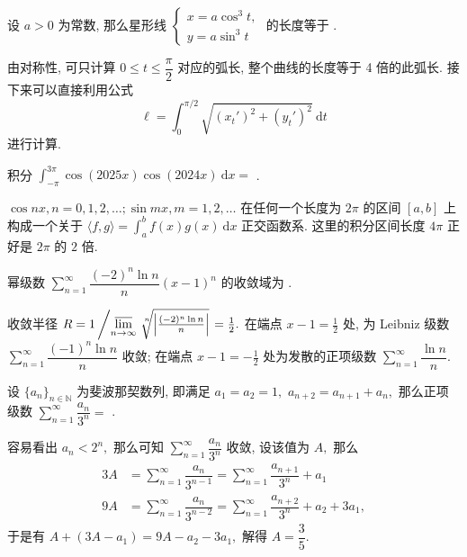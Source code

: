 \begin{question}
设 $a > 0$ 为常数, 那么星形线 $\begin{cases}
x = a \cos^3 t, \\ y = a \sin^3 t
\end{cases}$ 的长度等于 \fillin[$6a$].
\end{question}

\begin{solution}
由对称性, 可只计算 $0 \leqslant t \leqslant \dfrac{\pi}{2}$ 对应的弧长, 整个曲线的长度等于 4 倍的此弧长. 接下来可以直接利用公式
\[\ell = \int_0^{\pi/2} \sqrt{(x_t')^2 + (y_t')^2} ~ \mathrm{d} t\]
进行计算.
\end{solution}

\begin{question}
积分 $\displaystyle \int_{-\pi}^{3\pi} \cos (2025 x) \cos(2024 x) ~ \mathrm{d} x =$ \fillin[$0$].
\end{question}

\begin{solution}
$\cos nx, n = 0, 1, 2, \dots; \sin m x, m = 1, 2, \dots$ 在任何一个长度为 $2\pi$ 的区间 $[a,b]$ 上构成一个关于 $\langle f, g \rangle = \int_{a}^{b} f(x)g (x) ~ \mathrm{d} x$ 正交函数系. 这里的积分区间长度 $4\pi$ 正好是 $2\pi$ 的 $2$ 倍.
\end{solution}

\begin{question}
幂级数 $\sum\limits_{n=1}^{\infty} \dfrac{(-2)^n \ln n}{n} (x - 1)^n$ 的收敛域为 \fillin[ ${\left( \frac{1}{2}, \frac{3}{2} \right]}$ ].
\end{question}

\begin{solution}
收敛半径 $R = 1 \left/ \varlimsup\limits_{n\to\infty} \nroot[n]{\left|\frac{(-2)^n \ln n}{n}\right|} \right. = \frac{1}{2}.$ 在端点 $x - 1 = \frac{1}{2}$ 处, 为 Leibniz 级数 $\sum\limits_{n=1}^{\infty} \dfrac{(-1)^n \ln n}{n}$ 收敛; 在端点 $x - 1 = -\frac{1}{2}$ 处为发散的正项级数 $\sum\limits_{n=1}^{\infty} \dfrac{\ln n}{n}.$
\end{solution}

\begin{question}
设 $\{a_n\}_{n\in\mathbb{N}}$ 为斐波那契数列, 即满足 $a_1=a_2=1,$ $a_{n+2} = a_{n+1}+a_n,$ 那么正项级数 $\displaystyle \sum_{n=1}^{\infty} \dfrac{a_n}{3^n} = $ \fillin[$\frac{3}{5}$].
\end{question}

\begin{solution}
容易看出 $a_n < 2^n,$ 那么可知 $\displaystyle \sum_{n=1}^{\infty} \dfrac{a_n}{3^n}$ 收敛, 设该值为 $A,$ 那么
\begin{align*}
3A & = \sum_{n=1}^{\infty} \dfrac{a_n}{3^{n-1}} = \sum_{n=1}^{\infty} \dfrac{a_{n+1}}{3^{n}} + a_1 \\
9A & = \sum_{n=1}^{\infty} \dfrac{a_n}{3^{n-2}} = \sum_{n=1}^{\infty} \dfrac{a_{n+2}}{3^{n}} + a_2 + 3a_1,
\end{align*}
于是有 $A + (3A - a_1) = 9A - a_2 - 3a_1,$ 解得 $A = \dfrac{3}{5}.$
\end{solution}


